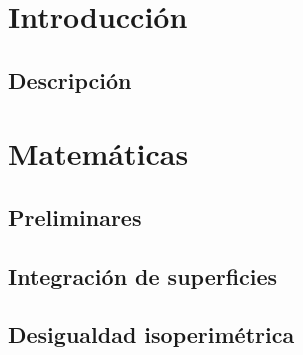 \documentclass[ oneside,openany,titlepage,numbers=noenddot,headinclude,%
                footinclude=true,cleardoublepage=empty,abstractoff, %
                BCOR=5mm,paper=a4,fontsize=11pt,%
                spanish,american%
                ]{scrreprt}
\begin{document}
\frenchspacing
\raggedbottom
{} %
\pagestyle{plain}
%


\cleardoublepage
\cleardoublepage
\cleardoublepage
\cleardoublepage
\pagestyle{scrheadings}
\cleardoublepage
\cleardoublepage{}
\cleardoublepage

\part{Introducción}

\chapter{Descripción}


\part{Matemáticas}

\chapter{Preliminares}


\chapter{Integración de superficies}


\chapter{Desigualdad isoperimétrica}

\end{document}
